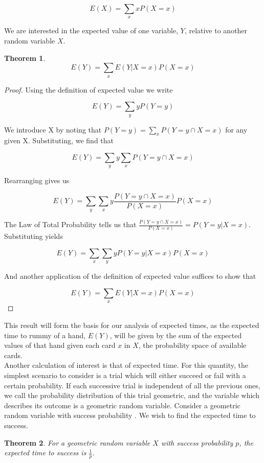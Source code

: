 \documentclass[paper=a4, fontsize=11pt,twoside]{report}   %
\newtheorem{theorem}{Theorem}
\begin{document}
$$E(X) = \sum_{x} x P(X = x)$$

We are interested in the expected value of one variable, $Y$, relative to another random variable $X$.

\begin{theorem}

$$E(Y) = \sum_{x} E(Y | X = x) P(X = x)$$
\end{theorem}

\begin{proof}
Using the definition of expected value we write

$$E(Y) = \sum_{y} y P(Y = y)$$

We introduce X by noting that $P(Y=y)=\sum_{x} P(Y=y \cap X = x) $ for any given X. Substituting, we find that

$$E(Y) = \sum_{y} y \sum_{x} P(Y = y \cap X = x)$$

Rearranging gives us

$$E(Y) = \sum_{y} \sum_{x} y \frac{P(Y = y \cap X = x)}{P(X=x)} P(X=x)$$

The Law of Total Probability tells us that $\frac{P(Y=y \cap X=x)}{P(X=x)} = P(Y=y | X=x)$. Substituting yields

$$E(Y) = \sum_{x} \sum_{y} y P(Y=y | X=x) P(X=x) $$

And another application of the definition of expected value suffices to show that

$$E(Y) =  \sum_{x} E(Y | X = x) P(X = x)$$

\end{proof}

This result will form the basis for our analysis of expected times, as the expected time to rummy of a hand, $E(Y)$, will be given by the sum of the expected values of that hand given each card $x$ in $X$, the probability space of available cards. \\

Another calculation of interest is that of expected time. For this quantity, the simplest scenario to consider is a trial which will either succeed or fail with a certain probability. If each successive trial is independent of all the previous ones, we call the probability distribution of this trial geometric, and the variable which describes its outcome is a geometric random variable. Consider a geometric random variable with success probability . We wish to find the expected time to success.\\

\begin{theorem}
For a geometric random variable $X$ with success probability $p$, the expected time to success is $\frac{1}{p}$. 
\end{theorem}
\end{document}
